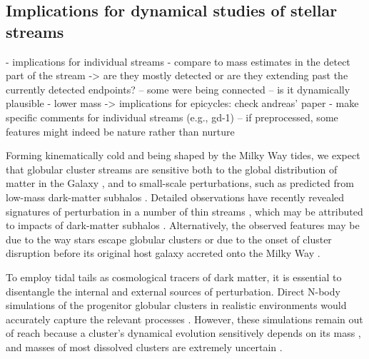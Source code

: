 \documentclass[twocolumn]{aastex63}
\begin{document}
\subsection{Implications for dynamical studies of stellar streams}
\label{sec:discuss_dynamics}
- implications for individual streams
- compare to mass estimates in the detect part of the stream -> are they mostly detected or are they extending past the currently detected endpoints? -- some were being connected -- is it dynamically plausible
- lower mass -> implications for epicycles: check andreas' paper
- make specific comments for individual streams (e.g., gd-1)
-- if preprocessed, some features might indeed be nature rather than nurture

Forming kinematically cold and being shaped by the Milky Way tides, we expect that globular cluster streams are sensitive both to the global distribution of matter in the Galaxy \citep[e.g.,][]{lux:2013, bonaca:2014, sanders:2014}, and to small-scale perturbations, such as predicted from low-mass dark-matter subhalos \citep[e.g.,][]{ibata:2002, yoon:2011, erkal:2016}.
Detailed observations have recently revealed signatures of perturbation in a number of thin streams \citep[e.g.,][]{pwb, bonaca:2019a, bonaca:2020, li:2020}, which may be attributed to impacts of dark-matter subhalos \citep[e.g.,][]{bonaca:2019b, banik:2019}.
Alternatively, the observed features may be due to the way stars escape globular clusters \citep[e.g.,][]{kuepper:2008, kuepper:2010} or due to the onset of cluster disruption before its original host galaxy accreted onto the Milky Way \citep[e.g.,][]{carlberg:2018, malhan:2020}.

To employ tidal tails as cosmological tracers of dark matter, it is essential to disentangle the internal and external sources of perturbation.
Direct N-body simulations of the progenitor globular clusters in realistic environments would accurately capture the relevant processes \citep[e.g.,][]{renaud:2015}.
However, these simulations remain out of reach because a cluster's dynamical evolution sensitively depends on its mass \citep[e.g.,][]{hh:2003, balbinot:2018}, and masses of most dissolved clusters are extremely uncertain \citep[e.g.,][]{erkal:2016b}.
\end{document}
